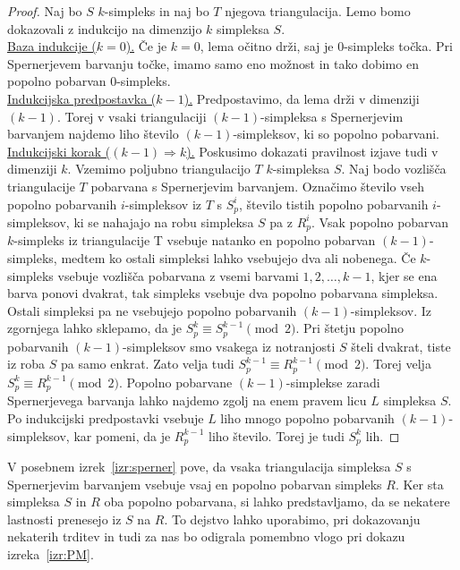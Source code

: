 \documentclass[mat1]{fmfdelo}
\newcommand{\0}{\underline{0}}
\begin{document}
\begin{proof}
Naj bo $S$ $k$-simpleks in naj bo $T$ njegova triangulacija. Lemo bomo dokazovali z indukcijo na dimenzijo $k$ simpleksa $S$. \\
\underline{Baza indukcije ($k = 0$).}
Če je $k=0$, lema očitno drži, saj je $0$-simpleks točka. Pri Spernerjevem barvanju točke, imamo samo eno možnost in tako dobimo en popolno pobarvan $0$-simpleks.\\
\underline{Indukcijska predpostavka ($k - 1$).}
Predpostavimo, da lema drži v dimenziji $(k - 1)$. Torej v vsaki triangulaciji $(k - 1)$-simpleksa s Spernerjevim barvanjem najdemo liho število $(k - 1)$-simpleksov, ki so popolno pobarvani. \\
\underline{Indukcijski korak ($(k - 1) \Longrightarrow k$).}
Poskusimo dokazati pravilnost izjave tudi v dimenziji $k$. Vzemimo poljubno triangulacijo $T$ $k$-simpleksa $S$. Naj bodo vozlišča triangulacije $T$ pobarvana s Spernerjevim barvanjem. Označimo število vseh popolno pobarvanih $i$-simpleksov iz $T$ s $S_p^i$, število tistih popolno pobarvanih $i$-simpleksov, ki se nahajajo na robu simpleksa $S$ pa z $R_p^i$. Vsak popolno pobarvan $k$-simpleks iz triangulacije T vsebuje natanko en popolno pobarvan $(k-1)$-simpleks, medtem ko ostali simpleksi lahko vsebujejo dva ali nobenega. Če $k$-simpleks vsebuje vozlišča pobarvana z vsemi barvami $1, 2, \dots, k-1$, kjer se ena barva ponovi dvakrat, tak simpleks vsebuje dva popolno pobarvana simpleksa. Ostali simpleksi pa ne vsebujejo popolno pobarvanih $(k - 1)$-simpleksov. Iz zgornjega lahko sklepamo, da je $S_p^k \equiv S_p^{k-1} \pmod 2$. Pri štetju popolno pobarvanih $(k - 1)$-simpleksov smo vsakega iz notranjosti $S$ šteli dvakrat, tiste iz roba $S$ pa samo enkrat. Zato velja tudi $S_p^{k-1} \equiv R_p^{k - 1} \pmod 2$. Torej velja $S_p^k \equiv R_p^{k - 1} \pmod 2$. Popolno pobarvane $(k - 1)$-simplekse zaradi Spernerjevega barvanja lahko najdemo zgolj na enem pravem licu $L$ simpleksa $S$. Po indukcijski predpostavki vsebuje $L$ liho mnogo popolno pobarvanih $(k - 1)$-simpleksov, kar pomeni, da je $R_p^{k - 1}$ liho število. Torej je tudi  $S_p^k$ lih.
\end{proof}
V posebnem izrek~\ref{izr:sperner} pove, da vsaka triangulacija simpleksa $S$ s Spernerjevim barvanjem vsebuje vsaj en popolno pobarvan simpleks $R$. Ker sta simpleksa $S$ in $R$ oba popolno pobarvana, si lahko predstavljamo, da se nekatere lastnosti prenesejo iz $S$ na $R$. To dejstvo lahko uporabimo, pri dokazovanju nekaterih trditev in tudi za nas bo odigrala pomembno vlogo pri dokazu izreka~\ref{izr:PM}. 
\end{document}
